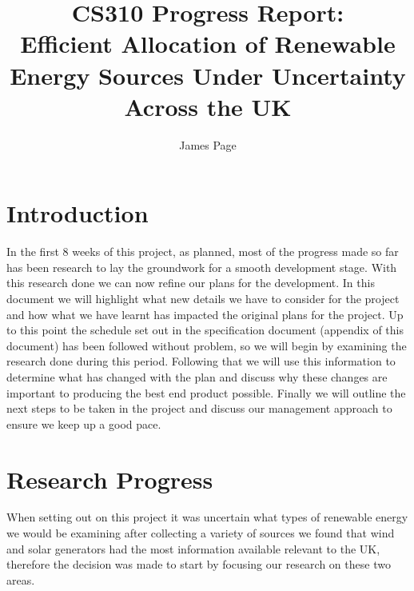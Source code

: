 \documentclass[twoside]{article}
\title{\myfont CS310 Progress Report:\\ \myfon Efficient Allocation of Renewable Energy Sources Under Uncertainty Across the UK} %
\author{James Page}
\begin{document}
\maketitle

\section{Introduction}

In the first 8 weeks of this project, as planned, most of the progress made so far has been research to lay the groundwork for a smooth development stage. With this research done we can now refine our plans for the development. In this document we will highlight what new details we have to consider for the project and how what we have learnt has impacted the original plans for the project. Up to this point the schedule set out in the specification document (appendix of this document) has been followed without problem, so we will begin by examining the research done during this period. Following that we will use this information to determine what has changed with the plan and discuss why these changes are important to producing the best end product possible. Finally we will outline the next steps to be taken in the project and discuss our management approach to ensure we keep up a good pace.


\section{Research Progress}

When setting out on this project it was uncertain what types of renewable energy we would be examining after collecting a variety of sources we found that wind and solar generators had the most information available relevant to the UK, therefore the decision was made to start by focusing our research on these two areas.
\end{document}
